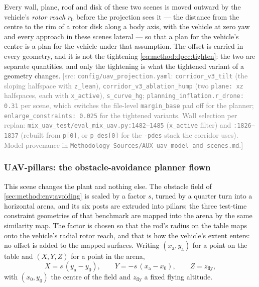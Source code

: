 \documentclass[headsepline,footsepline,footinclude=false,oneside,fontsize=11pt,paper=a4,listof=totoc,bibliography=totoc]{scrbook}
\theoremstyle{definition}
\theoremstyle{plain}
\theoremstyle{remark}
\newcommand{\sidx}[1]{_{\textrm{#1}}}
\newif\ifsubmission
\newcommand{\srcnote}[1]{\ifsubmission\else\textcolor{gray}{\footnotesize\textsf{[src: #1]}}\fi}
\begin{document}
Every wall, plane, roof and disk of these two scenes is moved outward by the vehicle's \emph{rotor
reach} $r\sidx{b}$ before the projection sees it --- the distance from the centre to the rim of a rotor
disk along a body axis, with the vehicle at zero yaw and every approach in these scenes lateral --- so
that a plan for the vehicle's centre is a plan for the vehicle under that assumption. The offset is
carried in every geometry, and it is not the tightening \eqref{eq:method:dpcc:tighten}: the two are
separate quantities, and only the tightening is what the tightened variant of a geometry changes.
\srcnote{\texttt{config/uav\_projection.yaml}: \texttt{corridor\_v3\_tilt} (the sloping halfspace with
\texttt{z\_lean}), \texttt{corridor\_v3\_ablation\_hump} (two \texttt{plane: xz} halfspaces, each with
\texttt{x\_active}), \texttt{s\_curve\_hg}; \texttt{planning\_inflation.r\_drone: 0.31} per scene, which
switches the file-level \texttt{margin\_base} pad off for the planner; \texttt{enlarge\_constraints:
0.025} for the tightened variants. Wall selection per replan:
\texttt{mix\_uav\_test/eval\_mix\_uav.py:1482--1485} (\texttt{x\_active} filter) and \texttt{:1826--1837}
(rebuilt from \texttt{p[0]}, or \texttt{p\_des[0]} for the \texttt{-pdes} stack the corridor uses). Model
provenance in \texttt{Methodology\_Sources/AUX\_uav\_model\_and\_scenes.md}.}

\subsubsection*{UAV-pillars: the obstacle-avoidance planner flown}

This scene changes the plant and nothing else. The obstacle field of \autoref{sec:method:env:avoiding}
is scaled by a factor $s$, turned by a quarter turn into a horizontal arena, and its six posts are
extruded into pillars; the three test-time constraint geometries of that benchmark are mapped into the
arena by the same similarity map. The factor is chosen so that the rod's radius on the table maps onto
the vehicle's radial rotor reach, and that is how the vehicle's extent enters: no offset is added to the
mapped surfaces. Writing $(x\sidx{a},y\sidx{a})$ for a point on the table and $(X,Y,Z)$ for a point in
the arena,
\begin{equation}\label{eq:method:env:pillarsmap}
  X = s\,(y\sidx{a}-y_{0}),
  \qquad
  Y = -s\,(x\sidx{a}-x_{0}),
  \qquad
  Z = z\sidx{fly},
\end{equation}
with $(x_{0},y_{0})$ the centre of the field and $z\sidx{fly}$ a fixed flying altitude.
\end{document}

